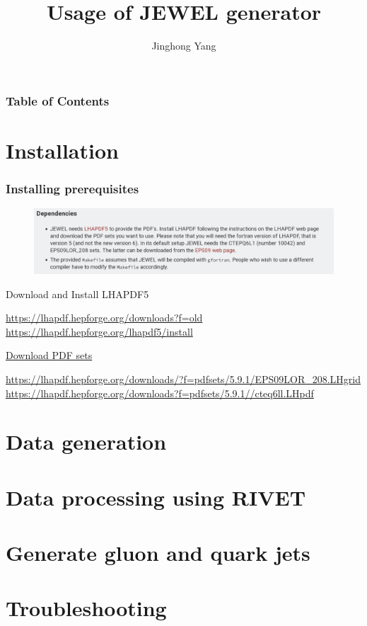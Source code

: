 \documentclass{beamer}
\title{Usage of JEWEL generator}
\author{Jinghong Yang}
\begin{document}
\begin{frame}
\titlepage
\end{frame}

\begin{frame}
\frametitle{Table of Contents}
\tableofcontents
\end{frame}

\section{Installation}
\begin{frame}
 \frametitle{Installing prerequisites}

 \begin{figure}[h]
  \centering
  \includegraphics[width=0.9\linewidth]{dependencies.png}
 \end{figure}

 \begin{block}{Download and Install LHAPDF5}
 \begin{scriptsize}
  \url{https://lhapdf.hepforge.org/downloads?f=old}
  \url{https://lhapdf.hepforge.org/lhapdf5/install}
  \end{scriptsize}
 \end{block}

 \begin{block}{\href{https://lhapdf.hepforge.org/lhapdf5/manual\#tth_sEcA}{Download PDF sets} }
 \begin{scriptsize}
  \url{https://lhapdf.hepforge.org/downloads/?f=pdfsets/5.9.1/EPS09LOR_208.LHgrid}
  \url{https://lhapdf.hepforge.org/downloads?f=pdfsets/5.9.1//cteq6ll.LHpdf}
\end{scriptsize}
 \end{block}


\end{frame}

\section{Data generation}

\section{Data processing using RIVET}

\section{Generate gluon and quark jets}

\section{Troubleshooting}
\end{document}
